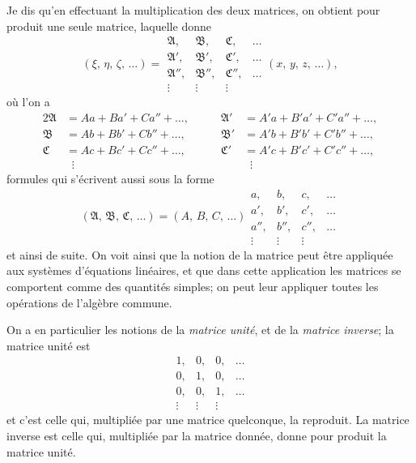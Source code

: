 \documentclass[11pt,a4paper]{article}
\theoremstyle{definition}
\begin{document}
Je dis qu'en effectuant la multiplication des deux matrices, on obtient
pour produit une seule matrice, laquelle donne
\[
(\xi,\, \eta,\, \zeta,\, \ldots) =
\begin{array}{|cccc|}
\mathfrak{A}, & \mathfrak{B}, & \mathfrak{C}, & \ldots \\
\mathfrak{A}', & \mathfrak{B}', & \mathfrak{C}', & \ldots \\
\mathfrak{A}'', & \mathfrak{B}'', & \mathfrak{C}'', & \ldots \\
\vdots & \vdots & \vdots &
\end{array}
(x,\, y,\, z,\, \ldots),
\]
o\`u l'on a
\begin{alignat*}{2}
\mathfrak{A} &= Aa + Ba' + Ca'' + \ldots,\qquad
& \mathfrak{A}' &= A'a + B'a' + C'a'' + \ldots, \\
\mathfrak{B} &= Ab + Bb' + Cb'' + \ldots,\qquad
& \mathfrak{B}' &= A'b + B'b' + C'b'' + \ldots, \\
\mathfrak{C} &= Ac + Bc' + Cc'' + \ldots,\qquad
& \mathfrak{C}' &= A'c + B'c' + C'c'' + \ldots, \\
& \;\;\vdots & & \;\;\vdots
\end{alignat*}
formules qui s'\'ecrivent aussi sous la forme
\[
(\mathfrak{A},\, \mathfrak{B},\, \mathfrak{C},\, \ldots)
= (A,\, B,\, C,\, \ldots)
\!
\begin{array}{|cccc|}
a, & b, & c, & \ldots \\
a', & b', & c', & \ldots \\
a'', & b'', & c'', & \ldots \\
\vdots & \vdots & \vdots &
\end{array}
\]
et ainsi de suite. On voit ainsi que la notion de la matrice peut \^etre
appliqu\'ee aux syst\`emes d'\'equations lin\'eaires, et que dans cette
application les matrices se comportent comme des quantit\'es simples; on
peut leur appliquer toutes les op\'erations de l'alg\`ebre commune.

\medskip

On a en particulier les notions de la \textit{matrice unit\'e}, et de la
\textit{matrice inverse}; la matrice unit\'e est
\[
\begin{array}{|cccc|}
1, & 0, & 0, & \ldots \\
0, & 1, & 0, & \ldots \\
0, & 0, & 1, & \ldots \\
\vdots & \vdots & \vdots &
\end{array}
\]
et c'est celle qui, multipli\'ee par une matrice quelconque, la reproduit.
La matrice inverse est celle qui, multipli\'ee par la matrice donn\'ee,
donne pour produit la matrice unit\'e.
\end{document}
